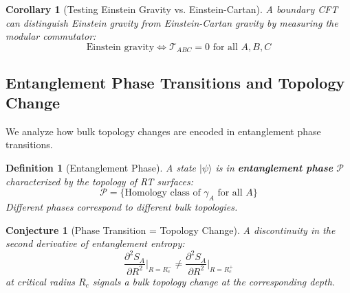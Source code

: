 \documentclass[12pt,a4paper]{article}
\newtheorem{conjecture}[theorem]{Conjecture}
\newtheorem{definition}[theorem]{Definition}
\newtheorem{corollary}[theorem]{Corollary}
\begin{document}
\begin{corollary}[Testing Einstein Gravity vs. Einstein-Cartan]
A boundary CFT can distinguish Einstein gravity from Einstein-Cartan gravity by measuring the modular commutator:
\begin{equation}
\text{Einstein gravity} \Leftrightarrow \mathcal{T}_{ABC} = 0 \text{ for all } A, B, C
\end{equation}
\end{corollary}

\subsection{Entanglement Phase Transitions and Topology Change}

We analyze how bulk topology changes are encoded in entanglement phase transitions.

\begin{definition}[Entanglement Phase]
A state $|\psi\rangle$ is in \textbf{entanglement phase} $\mathcal{P}$ characterized by the topology of RT surfaces:
\begin{equation}
\mathcal{P} = \{\text{Homology class of } \gamma_A \text{ for all } A\}
\end{equation}
Different phases correspond to different bulk topologies.
\end{definition}

\begin{conjecture}[Phase Transition = Topology Change]
A discontinuity in the second derivative of entanglement entropy:
\begin{equation}
\frac{\partial^2 S_A}{\partial R^2}\bigg|_{R = R_c^-} \neq \frac{\partial^2 S_A}{\partial R^2}\bigg|_{R = R_c^+}
\end{equation}
at critical radius $R_c$ signals a bulk topology change at the corresponding depth.
\end{conjecture}
\end{document}
